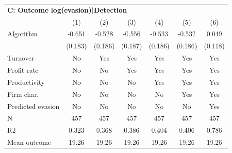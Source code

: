 \begin{tabular}{lcccccc}
\midrule \multicolumn{7}{l}{\textbf{C: Outcome log(evasion)|Detection}} \\ \multicolumn{1}{l}{} & (1) & (2) & (3) & (4) & (5) & (6) \\ \midrule
Algorithm   &      -0.651\sym{***}&      -0.528\sym{***}&      -0.556\sym{***}&      -0.533\sym{***}&      -0.532\sym{***}&       0.049         \\
            &     (0.183)         &     (0.186)         &     (0.187)         &     (0.186)         &     (0.186)         &     (0.118)         \\
\midrule
Turnover    &          No         &         Yes         &         Yes         &         Yes         &         Yes         &         Yes         \\
Profit rate &          No         &          No         &         Yes         &         Yes         &         Yes         &         Yes         \\
Productivity&          No         &          No         &          No         &         Yes         &         Yes         &         Yes         \\
Firm char.  &          No         &          No         &          No         &          No         &         Yes         &         Yes         \\
Predicted evasion&          No         &          No         &          No         &          No         &          No         &         Yes         \\
N           &         457         &         457         &         457         &         457         &         457         &         457         \\
R2          &       0.323         &       0.368         &       0.386         &       0.404         &       0.406         &       0.786         \\
Mean outcome&       19.26         &       19.26         &       19.26         &       19.26         &       19.26         &       19.26         \\
\bottomrule \end{tabular}

